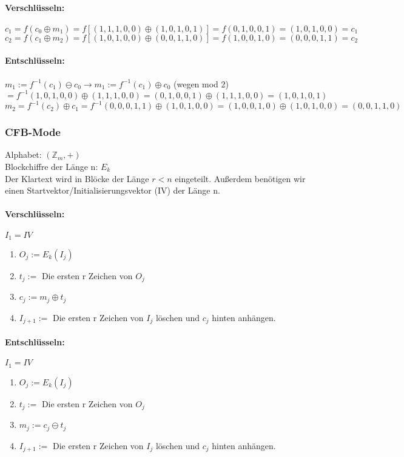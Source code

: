 \paragraph{Verschlüsseln:}
$c_1=f(c_0 \oplus m_1)=f[(1,1,1,0,0) \oplus (1,0,1,0,1)]=f(0,1,0,0,1) = (1,0,1,0,0) = c_1$\\
$c_2=f(c_1 \oplus m_2)=f[(1,0,1,0,0) \oplus (0,0,1,1,0)]=f(1,0,0,1,0) = (0,0,0,1,1) = c_2$\\

\paragraph{Entschlüsseln:}
$m_1 := f^{-1}(c_1) \ominus c_{0} \rightarrow m_1 := f^{-1}(c_1) \oplus c_{0}$ (wegen mod 2)\\
$=f^{-1}(1,0,1,0,0) \oplus (1,1,1,0,0) = (0,1,0,0,1) \oplus (1,1,1,0,0) = (1,0,1,0,1)$\\

$m_2=f^{-1}(c_2) \oplus c_{1} = f^{-1}(0,0,0,1,1) \oplus (1,0,1,0,0) = (1,0,0,1,0) \oplus (1,0,1,0,0) = (0,0,1,1,0)$

\subsubsection{CFB-Mode}
Alphabet: $(\mathbb{Z}_m,+)$\\
Blockchiffre der Länge n: $E_k$\\
Der Klartext wird in Blöcke der Länge $r < n$ eingeteilt. Außerdem benötigen wir einen Startvektor/Initialisierungsvektor (IV) der Länge n.

\paragraph{Verschlüsseln:}
$I_1 = IV$
\begin{enumerate}
\item $O_j := E_k(I_j)$
\item $t_j :=$ Die ersten r Zeichen von $O_j$
\item $c_j := m_j \oplus t_j$
\item $I_{j+1} :=$ Die ersten r Zeichen von $I_j$ löschen und $c_j$ hinten anhängen. 
\end{enumerate}

\paragraph{Entschlüsseln:} $I_1 = IV$
\begin{enumerate}
\item $O_j := E_k(I_j)$
\item $t_j :=$ Die ersten r Zeichen von $O_j$
\item $m_j := c_j \ominus t_j$
\item $I_{j+1} :=$ Die ersten r Zeichen von $I_j$ löschen und $c_j$ hinten anhängen. 
\end{enumerate}

